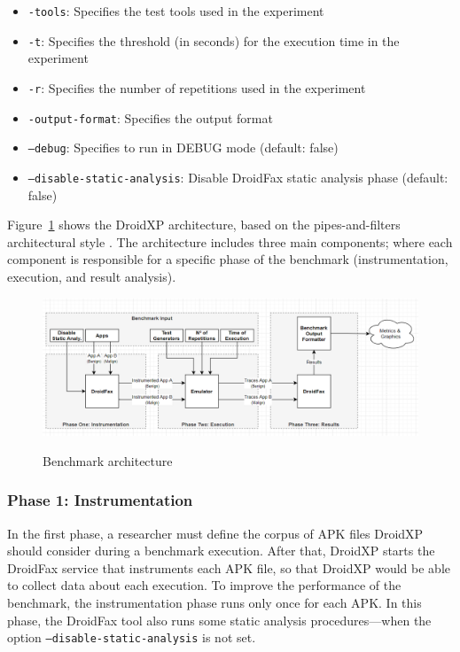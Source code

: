 \begin{itemize}
    \item \texttt{-tools}: Specifies the test tools used in the experiment
    \item \texttt{-t}: Specifies the threshold (in seconds) for the execution time in the experiment
    \item \texttt{-r}: Specifies the number of repetitions used in the experiment
    \item \texttt{-output-format}: Specifies the output format
    \item \texttt{--debug}: Specifies to run in DEBUG mode (default: false)
    \item \texttt{--disable-static-analysis}: Disable DroidFax static analysis phase (default: false)
\end{itemize}

Figure~\ref{fig:benchArq} shows the DroidXP architecture, based on the pipes-and-filters architectural style \cite{architecture-book}. 
The architecture includes three main components; where each component is responsible for a specific phase of the
benchmark (instrumentation, execution, and result analysis).

\begin{figure}[thb]
  \includegraphics[width=1\textwidth]{images/benchmark4.png}
  \label{benchArq}
  \caption{Benchmark architecture}
  \label{fig:benchArq}
\end{figure}
\subsubsection{Phase 1: Instrumentation}

In the first phase, a researcher must define the corpus of APK files DroidXP should consider during a benchmark execution. After that, DroidXP starts the DroidFax service that instruments each APK file, so that DroidXP would be able to collect data about each execution. To improve the performance of the benchmark, the instrumentation phase runs only once for each APK. In this phase, the DroidFax tool also runs some static analysis procedures---when the option \texttt{--disable-static-analysis} is not set.

